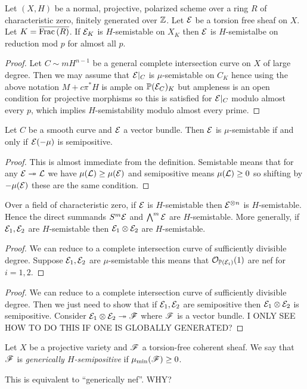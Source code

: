 \documentclass[12pt]{article}
\begin{document}
\begin{cor}
Let $(X, H)$ be a normal, projective, polarized scheme over a ring $R$ of characteristic zero, finitely generated over $\mathbb{Z}$. Let $\mathcal{E}$ be a torsion free sheaf on $X$. Let $K = \overline{\mathrm{Frac}\left(R\right)}$. If $\mathcal{E}_K$ is $H$-semistable on $X_K$ then $\mathcal{E}$ is $H$-semistalbe on reduction mod $p$ for almost all $p$.
\end{cor}

\begin{proof}
Let $C \sim m H^{n-1}$ be a general complete intersection curve on $X$ of large degree. Then we may assume that $\mathcal{E}|_C$ is $\mu$-semistable on $C_K$ hence using the above notation $M + c \pi^* H$ is ample on $\mathbb{P}(\mathcal{E}_C)_K$ but ampleness is an open condition for projective morphisms so this is satisfied for $\mathcal{E}|_C$ modulo almost every $p$, which implies $H$-semistability modulo almost every prime. 
\end{proof}

\begin{lemma}
Let $C$ be a smooth curve and $\mathcal{E}$ a vector bundle. Then $\mathcal{E}$ is $\mu$-semistable if and only if $\mathcal{E}(-\mu)$ is semipositive.
\end{lemma}

\begin{proof}
This is almost immediate from the definition. Semistable means that for any $\mathcal{E} \twoheadrightarrow \mathcal{L}$ we have $\mu(\mathcal{L}) \ge \mu(\mathcal{E})$ and semipositive means $\mu(\mathcal{L}) \ge 0$ so shifting by $- \mu(\mathcal{E})$ these are the same condition. 
\end{proof}

\begin{cor}
Over a field of characteristic zero, if $\mathcal{E}$ is $H$-semistable then $\mathcal{E}^{\otimes n}$ is $H$-semistable. Hence the direct summands $S^m \mathcal{E}$ and $\bigwedge^m \mathcal{E}$ are $H$-semistable. More generally, if $\mathcal{E}_1, \mathcal{E}_2$ are $H$-semistable then $\mathcal{E}_1 \otimes \mathcal{E}_2$ are $H$-semistable. 
\end{cor}

\begin{proof}
We can reduce to a complete intersection curve of sufficiently divisible degree. Suppose $\mathcal{E}_1, \mathcal{E}_2$ are $\mu$-semistable this means that $\mathcal{O}_{\mathbb{P}(\mathcal{E}_i)}(1)$ are nef for $i = 1,2$.
\end{proof}

\begin{cor}

\end{cor}

\begin{proof}
We can reduce to a complete intersection curve of sufficiently divisible degree. 
Then we just need to show that if $\mathcal{E}_1, \mathcal{E}_2$ are semipositive then $\mathcal{E}_1 \otimes \mathcal{E}_2$ is semipositive. Consider $\mathcal{E}_1 \otimes \mathcal{E}_2 \twoheadrightarrow \mathscr{F}$ where $\mathscr{F}$ is a vector bundle. {\color{red} I ONLY SEE HOW TO DO THIS IF ONE IS GLOBALLY GENERATED?}
\end{proof}

\begin{defn}
Let $X$ be a projective variety and $\mathscr{F}$ a torsion-free coherent sheaf. We say that $\mathscr{F}$ is \textit{generically $H$-semipositive} if $\mu_{\min}(\mathscr{F}) \ge 0$.
\end{defn}

\begin{rmk}
This is equivalent to ``generically nef''. {\color{red} WHY?}
\end{rmk}
\end{document}
